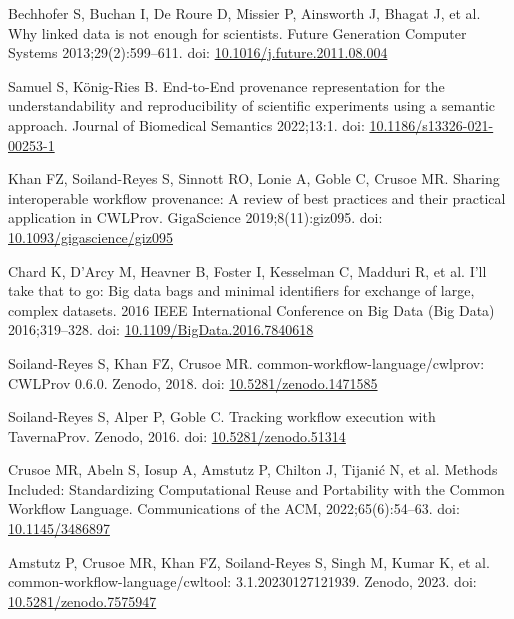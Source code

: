 \documentclass[10pt,letterpaper]{article}
\begin{document}
\begin{thebibliography}{10}
\begin{small}
Bechhofer S, Buchan I, De Roure D, Missier P, Ainsworth J, Bhagat J, et al.
Why linked data is not enough for scientists.
Future Generation Computer Systems 2013;29(2):599--611.
doi: \href{https://doi.org/10.1016/j.future.2011.08.004}{10.1016/j.future.2011.08.004}

Samuel S, König-Ries B.
End-to-End provenance representation for the understandability and reproducibility of scientific experiments using a semantic approach.
Journal of Biomedical Semantics 2022;13:1.
doi: \href{https://doi.org/10.1186/s13326-021-00253-1}{10.1186/s13326-021-00253-1}



Khan FZ, Soiland-Reyes S, Sinnott RO, Lonie A, Goble C, Crusoe MR.
Sharing interoperable workflow provenance: A review of best practices and their practical application in CWLProv.
GigaScience 2019;8(11):giz095.
doi: \href{https://doi.org/10.1093/gigascience/giz095}{10.1093/gigascience/giz095}

Chard K, D'Arcy M, Heavner B, Foster I, Kesselman C, Madduri R, et al.
I'll take that to go: Big data bags and minimal identifiers for exchange of large, complex datasets.
2016 IEEE International Conference on Big Data (Big Data) 2016;319--328.
doi: \href{https://doi.org/10.1109/BigData.2016.7840618}{10.1109/BigData.2016.7840618}

Soiland-Reyes S, Khan FZ, Crusoe MR.
common-workflow-language/cwlprov: CWLProv 0.6.0.
Zenodo, 2018.
doi: \href{https://doi.org/10.5281/zenodo.1471585}{10.5281/zenodo.1471585}

Soiland-Reyes S, Alper P, Goble C.
Tracking workflow execution with TavernaProv.
Zenodo, 2016.
doi: \href{https://doi.org/10.5281/zenodo.51314}{10.5281/zenodo.51314}

Crusoe MR, Abeln S, Iosup A, Amstutz P, Chilton J, Tijanić N, et al.
Methods Included: Standardizing Computational Reuse and Portability with the Common Workflow Language.
Communications of the ACM, 2022;65(6):54--63.
doi: \href{https://doi.org/10.1145/3486897}{10.1145/3486897}

Amstutz P, Crusoe MR, Khan FZ, Soiland-Reyes S, Singh M, Kumar K, et al.
common-workflow-language/cwltool: 3.1.20230127121939.
Zenodo, 2023.
doi: \href{https://doi.org/10.5281/zenodo.7575947}{10.5281/zenodo.7575947}


\end{small}
\end{thebibliography}
\end{document}
